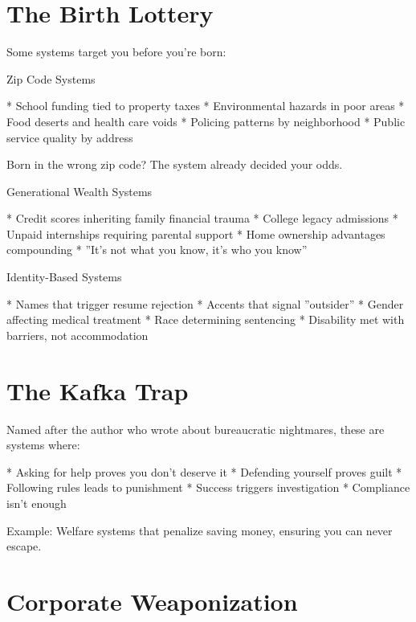 \documentclass[12pt,oneside]{book}
\begin{document}
\section{The Birth Lottery}

Some systems target you before you're born:

                Zip Code Systems

                    * School funding tied to property taxes
                    * Environmental hazards in poor areas
                    * Food deserts and health care voids
                    * Policing patterns by neighborhood
                    * Public service quality by address

Born in the wrong zip code? The system already decided your odds.

                Generational Wealth Systems

                    * Credit scores inheriting family financial trauma
                    * College legacy admissions
                    * Unpaid internships requiring parental support
                    * Home ownership advantages compounding
                    * ''It's not what you know, it's who you know''

                Identity-Based Systems

                    * Names that trigger resume rejection
                    * Accents that signal ''outsider''
                    * Gender affecting medical treatment
                    * Race determining sentencing
                    * Disability met with barriers, not accommodation

\section{The Kafka Trap}

Named after the author who wrote about bureaucratic nightmares, these are systems where:

                    * Asking for help proves you don't deserve it
                    * Defending yourself proves guilt
                    * Following rules leads to punishment
                    * Success triggers investigation
                    * Compliance isn't enough

Example: Welfare systems that penalize saving money, ensuring you can never escape.

\section{Corporate Weaponization}
\end{document}
